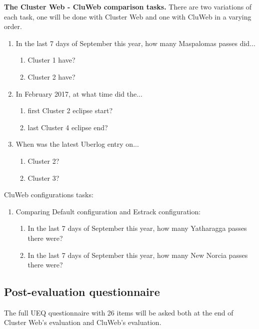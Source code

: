\textbf{The Cluster Web - CluWeb comparison tasks.} There are two variations of each task, one will be done with Cluster Web and one with CluWeb in a varying order.
\begin{enumerate}
\item In the last 7 days of September this year, how many Maspalomas passes did...
\begin{enumerate}
\item Cluster 1 have?
\item Cluster 2 have?
\end{enumerate}
\item In February 2017, at what time did the...
\begin{enumerate}
\item first Cluster 2 eclipse start?
\item last Cluster 4 eclipse end?
\end{enumerate}
\item When was the latest Uberlog entry on...
\begin{enumerate}
\item Cluster 2?
\item Cluster 3?
\end{enumerate}
\end{enumerate}

CluWeb configurations tasks:
\begin{enumerate}
\item Comparing Default configuration and Estrack configuration:
\begin{enumerate}
\item In the last 7 days of September this year, how many Yatharagga passes there were?
\item In the last 7 days of September this year, how many New Norcia passes there were?
\end{enumerate}
\end{enumerate}

\subsection{Post-evaluation questionnaire} \label{post-evaluation}
The full UEQ questionnaire with 26 items \cite{laugwitz2008construction} will be asked both at the end of Cluster Web's evaluation and CluWeb's evaluation.

